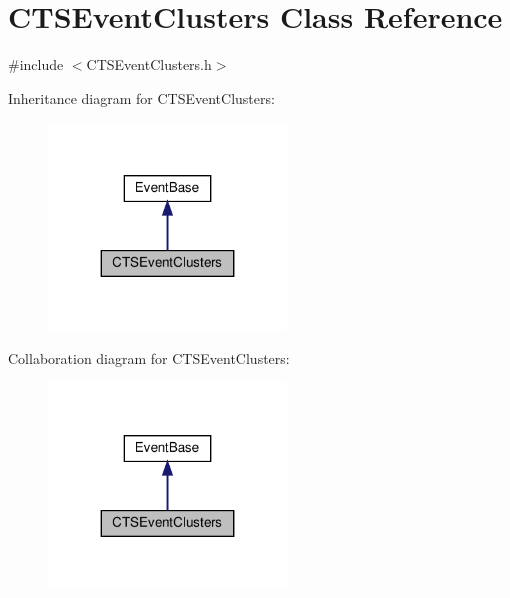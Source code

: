 \hypertarget{classCTSEventClusters}{}\section{C\+T\+S\+Event\+Clusters Class Reference}
\label{classCTSEventClusters}


{\ttfamily \#include $<$C\+T\+S\+Event\+Clusters.\+h$>$}



Inheritance diagram for C\+T\+S\+Event\+Clusters\+:\nopagebreak
\begin{figure}[H]
\begin{center}
\leavevmode
\includegraphics[width=179pt]{classCTSEventClusters__inherit__graph}
\end{center}
\end{figure}


Collaboration diagram for C\+T\+S\+Event\+Clusters\+:\nopagebreak
\begin{figure}[H]
\begin{center}
\leavevmode
\includegraphics[width=179pt]{classCTSEventClusters__coll__graph}
\end{center}
\end{figure}
